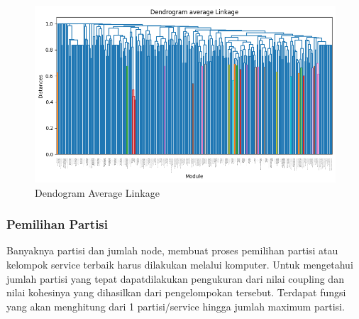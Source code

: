 \begin{figure}[htbp]
	\centering
	\begin{minipage}{1\textwidth}
		\centering
		\includegraphics[width=1\textwidth]{img/bab_4/avg_dd.png}
		\caption{Dendogram Average Linkage }
		\label{fig:dd_avg}
	\end{minipage}\hfill	
\end{figure}

\pagebreak

\subsubsection{Pemilihan Partisi}
Banyaknya partisi dan jumlah node, membuat proses pemilihan partisi atau kelompok service terbaik harus dilakukan melalui komputer. Untuk mengetahui jumlah partisi yang tepat dapatdilakukan pengukuran dari nilai coupling dan nilai kohesinya yang dihasilkan dari pengelompokan tersebut. Terdapat fungsi yang akan menghitung dari 1 partisi/service hingga jumlah maximum partisi. 

